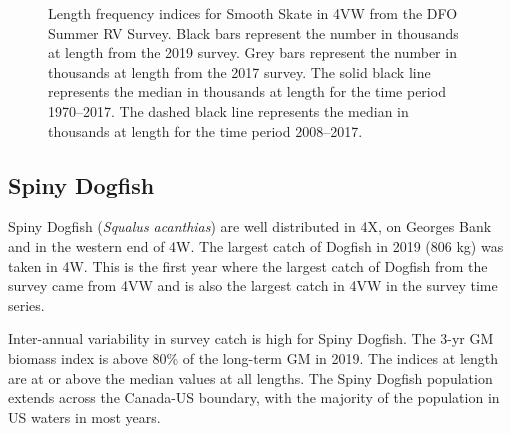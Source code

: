 \documentclass[11pt]{book}
\begin{document}
\begin{figure}[htb]

{\centering {} 

}

\caption{Length frequency indices for Smooth Skate in 4VW from the DFO Summer RV Survey. Black bars represent the number in thousands at length from the 2019 survey. Grey bars represent the number in thousands at length from the 2017 survey. The solid black line represents the median in thousands at length for the time period 1970--2017. The dashed black line represents the median in thousands at length for the time period 2008--2017.}\label{fig:104-fig-smoothskate-lengthfreq4VW}
\end{figure}
\clearpage

\hypertarget{spiny-dogfish}{%
\subsection{Spiny Dogfish}\label{spiny-dogfish}}

Spiny Dogfish (\emph{Squalus acanthias}) are well distributed in 4X, on Georges Bank and in the western end of 4W. The largest catch of Dogfish in 2019 (806 kg) was taken in 4W. This is the first year where the largest catch of Dogfish from the survey came from 4VW and is also the largest catch in 4VW in the survey time series.

Inter-annual variability in survey catch is high for Spiny Dogfish. The 3-yr GM biomass index is above 80\% of the long-term GM in 2019. The indices at length are at or above the median values at all lengths. The Spiny Dogfish population extends across the Canada-US boundary, with the majority of the population in US waters in most years.
\end{document}
